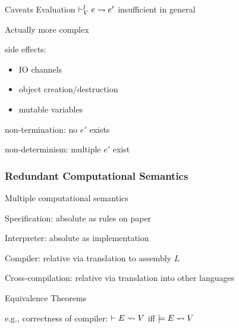 \begin{frame}{Caveats}
Evaluation $\vdash^l_V e\rightsquigarrow e'$ insufficient in general

\begin{blockitems}{Actually more complex}
\item side effects:
	\begin{itemize}
	\item IO channels
	\item object creation/destruction
	\item mutable variables
	\end{itemize}
\item non-termination: no $e'$ exists
\item non-determinism: multiple $e'$ exist
\end{blockitems}
\end{frame}

\begin{frame}\frametitle{Redundant Computational Semantics}
\begin{blockitems}{Multiple computational semantics}
\item Specification: absolute as rules on paper
\item Interpreter: absolute as implementation
\item Compiler: relative via translation to assembly $L$
\item Cross-compilation: relative via translation into other languages
\end{blockitems}

\begin{blockitems}{Equivalence Theorems}
\item e.g., correctness of compiler: $\vdash E\rightsquigarrow V$ iff $\models E\rightsquigarrow V$
\end{blockitems}
\end{frame}

